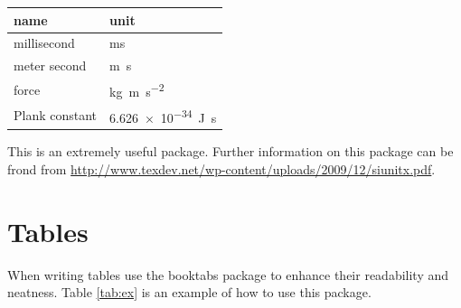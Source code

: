 \begin{table}[h!]
\centering
\begin{tabular}{ll}
\toprule
name & unit \\ \midrule
millisecond & \si{ms} \\
meter second & \si{m.s} \\
force & \si{kg.m.s^{-2}}\\
Plank constant & \SI{6.626e-34}{J.s}\\
\bottomrule
\end{tabular}
\end{table}

This is an extremely useful package. Further information on this package can be frond from \url{http://www.texdev.net/wp-content/uploads/2009/12/siunitx.pdf}. 

\section{Tables}

When writing tables use the booktabs package to enhance their readability and neatness. Table \ref{tab:ex} is an example of how to use this package.

